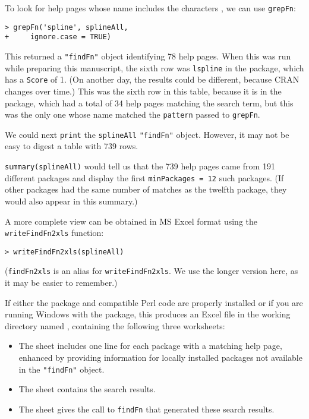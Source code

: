 To look for help pages whose name includes the characters
, we can use {\tt grepFn}:
\begin{verbatim}
> grepFn('spline', splineAll,
+     ignore.case = TRUE)
\end{verbatim}
This returned a {\tt "findFn"} object identifying 78 help pages.
When this was
run while preparing this manuscript, the sixth row was
{\tt lspline} in the
 package, which has a {\tt Score} of 1.
(On another day, the results could be different, because
CRAN changes over time.)  This was the sixth row in this
table, because it is in the
 package, which had a total of 34 help
pages matching the search term, but this was the only
one whose name matched the {\tt pattern} passed to {\tt grepFn}.

We could next {\tt print} the {\tt splineAll} {\tt "findFn"}
object.  However, it may not be easy to digest a table
with 739 rows.

{\tt summary(splineAll)} would tell us that the 739 help pages
came from 191 different packages and display the first
{\tt minPackages = 12} such packages.
(If other packages had the same number of
matches as the twelfth package, they would also appear in this
summary.)

A more complete view can be obtained in MS Excel format
using the {\tt writeFindFn2xls} function:
\begin{verbatim}
> writeFindFn2xls(splineAll)
\end{verbatim}
({\tt findFn2xls} is an alias for {\tt writeFindFn2xls}.
We use the longer version here, as it may be
easier to remember.)

If either the  package and compatible Perl code
are properly installed or if you are running Windows with
the  package, this produces an Excel file in the
working directory named , containing the
following three worksheets:

\begin{itemize}
\item{The  sheet includes one line for each
package with a matching help page, enhanced by providing
information for locally installed packages
not available in the {\tt "findFn"} object.}
\item{The  sheet contains the search results.}
\item{The  sheet gives the call to {\tt findFn}
that generated these search results.}
\end{itemize}

